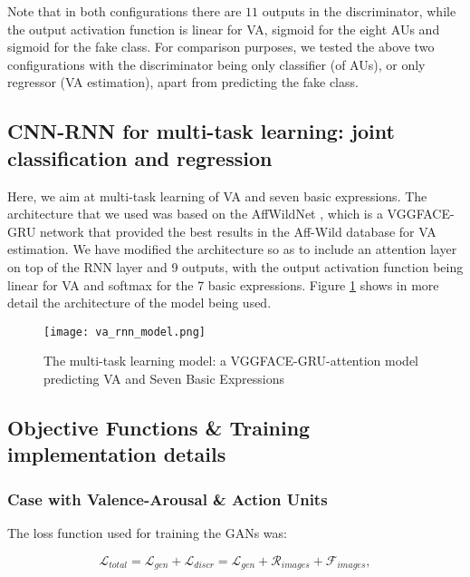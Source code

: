 \documentclass[a4paper, 10pt, conference]{ieeeconf}      %
\begin{document}
Note that in both configurations there are $11$ outputs in the discriminator, while the output activation function is linear for VA, sigmoid for the eight AUs and sigmoid for the fake class. 
For comparison purposes, we tested the above two configurations with the discriminator being only classifier (of AUs), or only regressor (VA estimation), apart from predicting the fake class.


\subsection{CNN-RNN for multi-task learning: joint  classification and regression}\label{cnn-rnn_va_expr}

Here, we aim at multi-task learning of VA and seven basic expressions. The architecture that we used was based on the AffWildNet \cite{kollias2017recognition}, which is a VGGFACE-GRU \cite{parkhi2015deep}\cite{chung2014empirical} network that provided the best results in the Aff-Wild database for VA estimation. We have modified the architecture so as to include an attention layer on top of the RNN layer and 9 outputs, with the output activation function being linear for VA and softmax for the 7 basic expressions. Figure \ref{va-expr-model} shows in more detail the architecture of the model being used.

\begin{figure}[h]
    \centering
    \texttt{[image: va\_rnn\_model.png]}
    \caption{The multi-task learning model: a VGGFACE-GRU-attention model predicting VA and Seven Basic Expressions}
    \label{va-expr-model}
\end{figure}




\subsection{Objective Functions \& Training implementation details}

\subsubsection{Case with Valence-Arousal \& Action Units}

The loss function used for training the GANs was: 
\vskip -0.5cm

\begin{equation} \label{eq_1}
\mathcal{L}_{total} = \mathcal{L}_{gen} + \mathcal{L}_{discr} = \mathcal{L}_{gen} + \mathcal{R}_{images} + \mathcal{F}_{images},
\end{equation}
\end{document}
